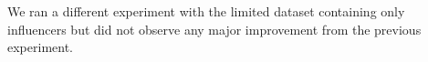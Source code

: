 \noindent We ran a different experiment with the limited dataset containing only influencers but did not observe any major improvement from the previous experiment.
